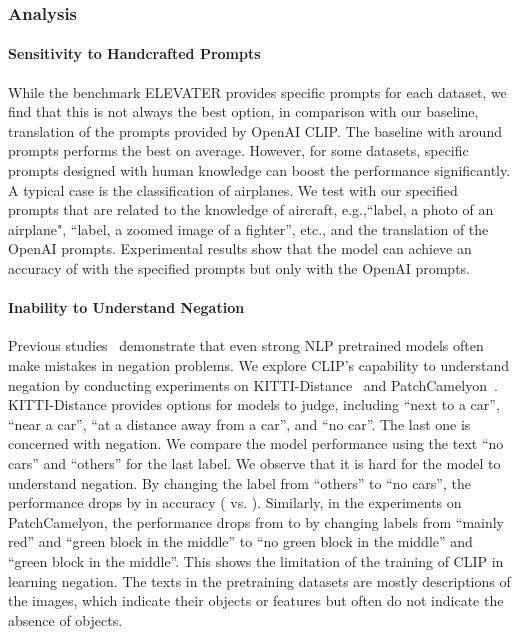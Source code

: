 \documentclass[11pt]{article}
\begin{document}
\subsubsection{Analysis}


\paragraph{Sensitivity to Handcrafted Prompts}
While the benchmark ELEVATER provides specific prompts for each dataset, we find that this is not always the best option, in comparison with our baseline, translation of the prompts provided by OpenAI CLIP. 
The baseline with around  prompts performs the best on average. 
However, for some datasets, specific prompts designed with human knowledge can boost the performance significantly. 
A typical case is the classification of airplanes. 
We test  with our specified prompts that are related to the knowledge of aircraft, e.g.,``{label}, a photo of an airplane", ``{label}, a zoomed image of a fighter'', etc., and the translation of the OpenAI prompts.
Experimental results show that the model can achieve an accuracy of  with the specified prompts but only  with the OpenAI prompts. 



\paragraph{Inability to Understand Negation}
Previous studies~\citep{negbert, bertnot} demonstrate that even strong NLP pretrained models  often make mistakes in negation problems. 
We explore CLIP's capability to understand negation by conducting experiments on KITTI-Distance~\citep{kitti} and PatchCamelyon~\citep{patchcamelyon}. 
KITTI-Distance provides  options for models to judge, including ``next to a car'', ``near a car'', ``at a distance away from a car'', and ``no car''. The last one is concerned with negation. 
We compare the model performance using the text ``no cars'' and ``others'' for the last label. 
We observe that it is hard for the model to understand negation. By changing the label from ``others'' to ``no cars'', the performance drops by  in accuracy ( vs. ). 
Similarly, in the experiments on PatchCamelyon, the performance drops from  to  by changing labels from ``mainly red'' and ``green block in the middle'' to ``no green block in the middle'' and ``green block in the middle''. 
This shows the limitation of the training of CLIP in learning negation. 
The texts in the pretraining datasets are mostly descriptions of the images, which indicate their objects or features but often do not indicate the absence of objects. 
\end{document}
